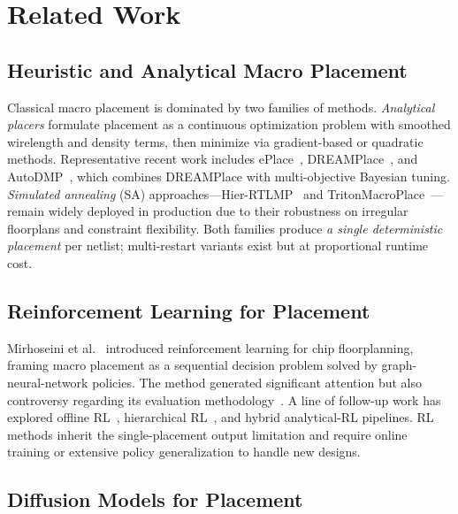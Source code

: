 
\section{Related Work}
\label{sec:related}

\subsection{Heuristic and Analytical Macro Placement}

Classical macro placement is dominated by two families of methods. \emph{Analytical placers} formulate placement as a continuous optimization problem with smoothed wirelength and density terms, then minimize via gradient-based or quadratic methods. Representative recent work includes ePlace~\cite{lu2015eplace}, DREAMPlace~\cite{lin2019dreamplace}, and AutoDMP~\cite{autodmp}, which combines DREAMPlace with multi-objective Bayesian tuning. \emph{Simulated annealing} (SA) approaches—Hier-RTLMP~\cite{hier-rtlmp} and TritonMacroPlace~\cite{tritonmacroplace}—remain widely deployed in production due to their robustness on irregular floorplans and constraint flexibility. Both families produce \emph{a single deterministic placement} per netlist; multi-restart variants exist but at proportional runtime cost.

\subsection{Reinforcement Learning for Placement}

Mirhoseini et al.~\cite{mirhoseini2021nature} introduced reinforcement learning for chip floorplanning, framing macro placement as a sequential decision problem solved by graph-neural-network policies. The method generated significant attention but also controversy regarding its evaluation methodology~\cite{cheng2024rethinking}. A line of follow-up work has explored offline RL~\cite{zhang2023offline}, hierarchical RL~\cite{lai2022maskplace}, and hybrid analytical-RL pipelines. RL methods inherit the single-placement output limitation and require online training or extensive policy generalization to handle new designs.

\subsection{Diffusion Models for Placement}

